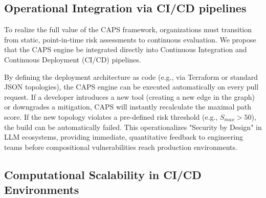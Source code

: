 \subsection{Operational Integration via CI/CD pipelines}
To realize the full value of the CAPS framework, organizations must transition from static, point-in-time risk assessments to continuous evaluation. We propose that the CAPS engine be integrated directly into Continuous Integration and Continuous Deployment (CI/CD) pipelines. 

By defining the deployment architecture as code (e.g., via Terraform or standard JSON topologies), the CAPS engine can be executed automatically on every pull request. If a developer introduces a new tool (creating a new edge in the graph) or downgrades a mitigation, CAPS will instantly recalculate the maximal path score. If the new topology violates a pre-defined risk threshold (e.g., $S_{max} > 50$), the build can be automatically failed. This operationalizes "Security by Design" in LLM ecosystems, providing immediate, quantitative feedback to engineering teams before compositional vulnerabilities reach production environments.

\subsection{Computational Scalability in CI/CD Environments}

\begin{table}[h]
\centering
{}
\caption{}
\label{tab:performance}
\end{table}

